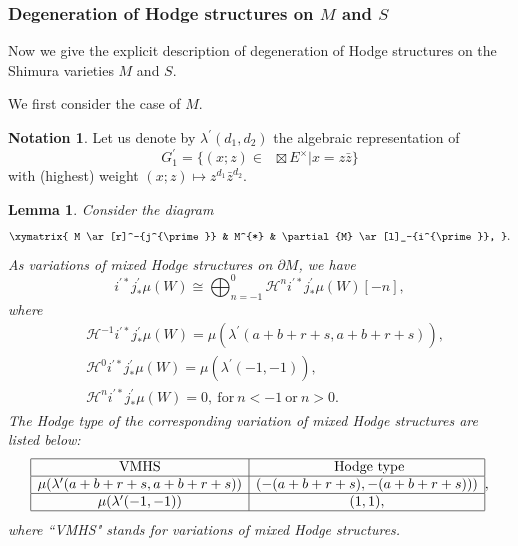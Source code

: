 \documentclass[11pt, a4paper]{amsart}
\theoremstyle{plain}
\newtheorem{lemma}[theorem]{Lemma}
\theoremstyle{definition}
\newtheorem{notation}[theorem]{Notation}
\numberwithin{equation}{section}
\DeclareMathOperator{\Gm}{\mathrm{G_{m}}}
\begin{document}
\subsubsection{Degeneration of Hodge structures on $M$ and $S$}
Now we give the explicit description of degeneration of Hodge structures on the Shimura varieties $M$ and $S$. \\

\par We first consider the case of $M$. 

\begin{notation}
Let us denote by $\lambda^{\prime}(d_1, d_2)$ the algebraic representation of 
\begin{equation*}
    G_1^{\prime} = \{(x;z) \in \Gm \boxtimes E^{\times} | x = z \bar{z} \}
\end{equation*}
with (highest) weight $(x; z) \mapsto z^{d_1}\bar{z}^{d_2}$. 
\end{notation}

\begin{lemma}
\label{lemma: BW_H}
    Consider the diagram 
    \[
        \xymatrix{
            M \ar[r]^-{j^{\prime}}  & M^{*}  & \partial{M} \ar[l]_-{i^{\prime}},  
        }. 
    \]
    As variations of mixed Hodge structures on $\partial M$, we have 
    \begin{equation}
    \label{eq: H: deg of MHS}
        i^{\prime*}j_{*}^{\prime} \mu(W) \cong \bigoplus_{n = -1}^{0} \mathcal{H}^{n}i^{\prime*}j_{*}^{\prime} \mu(W)[-n], 
    \end{equation}
    where 
    \begin{align*}
        & \mathcal{H}^{-1}i^{\prime*}j_{*}^{\prime}\mu(W) = \mu(\lambda^{\prime}(a + b + r + s, a + b + r + s)), \\
        & \mathcal{H}^{0}i^{\prime*}j_{*}^{\prime}\mu(W) = \mu(\lambda^{\prime}(-1, -1)), \\
        & \mathcal{H}^{n}i^{\prime*}j_{*}^{\prime}\mu(W) = 0, \ \text{for} \ n < -1 \ \text{or} \ n > 0. 
    \end{align*}
    The Hodge type of the corresponding variation of mixed Hodge structures are listed below: 
     \begin{equation}
     \label{eq: H: Hodge type}
            \begin{array}{|c|c|}
            \hline \text{VMHS} & \text{ Hodge type} \\
            \hline \mu(\lambda^{\prime}(a + b + r + s, a + b + r + s)) & (-(a + b + r + s), -(a + b + r + s))) \\
            \hline \mu(\lambda^{\prime}(-1, -1)) & (1, 1), \\
            \hline 
            \end{array}, 
    \end{equation}
    where ``VMHS" stands for variations of mixed Hodge structures.    
\end{lemma}
\end{document}
